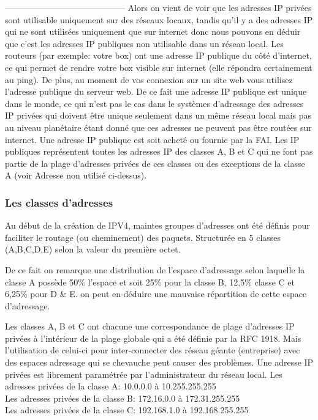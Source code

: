 \begin{description}




------------------------------------------
Alors on vient de voir que les adresses IP privées sont utilisable uniquement
sur des réseaux locaux, tandis qu’il y a des adresses IP qui ne sont utilisées
uniquement que sur internet donc nous pouvons en déduir que c’est les adresses
IP publiques non utilisable dans un réseau local. Les routeurs (par exemple:
votre box) ont une adresse IP publique du côté d’internet, ce qui permet de
rendre votre box visible sur internet (elle répondra certainement au ping). De
plus, au moment de vos connexion sur un site web vous utilisez l’adresse
publique du serveur web. De ce fait une adresse IP publique est unique dans le
monde, ce qui n’est pas le cas dans le systèmes d’adressage des adresses IP
privées qui doivent être unique seulement dans un même réseau local mais pas au
niveau planétaire étant donné que ces adresses ne peuvent pas être routées sur
internet. Une adresse IP publique est soit acheté ou fournie par la FAI.  Les
IP publiques représentent toutes les adresses IP des classes A, B et C qui ne
font pas partie de la plage d’adresses privées de ces classes ou des exceptions
de la classe A (voir Adresse non utilisé ci-dessus).


\subsubsection{Les classes d’adresses}
Au début de la création de IPV4, maintes groupes d’adresses ont été définis
pour faciliter le routage (ou cheminement) des paquets. Structurée en 5 classes
(A,B,C,D,E) selon la valeur du première octet.


De ce fait on remarque une distribution de l’espace d’adressage selon laquelle
la classe A possède 50\% l’espace et soit 25\% pour la classe B, 12,5\% classe
C et 6,25\% pour D \& E. on peut en-déduire une mauvaise répartition de cette
espace d’adressage. 

Les classes A, B et C ont chacune une correspondance de plage
d’adresses IP privées à l’intérieur de la plage globale qui a été définie par
la RFC 1918. Mais l’utilisation  de celui-ci pour inter-connecter des réseau
géante (entreprise) avec des espaces adressage qui se chevauche peut causer des
problèmes. Une adresse IP privées est librement paramétrée par l’administrateur
du réseau local.
Les adresses privées de la classe A: 10.0.0.0 à 10.255.255.255\\
Les adresses privées de la classe B: 172.16.0.0 à 172.31.255.255\\
Les adresses privées de la classe C: 192.168.1.0 à 192.168.255.255\\



\end{description}
